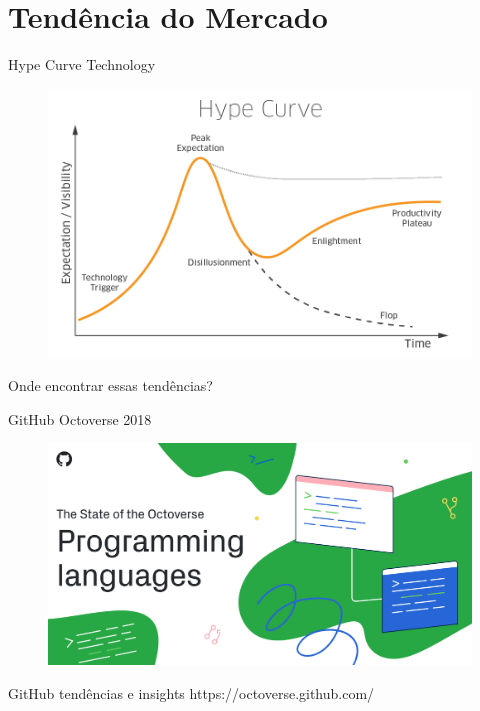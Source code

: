 \section{Tendência do Mercado}

\begin{frame}[fragile]{Hype Curve Technology}
\begin{figure}[ht!]
  \centering
  \includegraphics[scale=0.29]{images/hype_curve.png}
\end{figure}
\begin{center}
\small{Onde encontrar essas tendências?}
\end{center}
\end{frame}

\begin{frame}[fragile]{GitHub Octoverse 2018}
\begin{figure}[ht!]
  \centering
  \includegraphics[scale=0.3]{images/octoverse.png}
\end{figure}
\begin{center}
\small{GitHub tendências e insights}
\small{https://octoverse.github.com/}
\end{center}
\end{frame}

